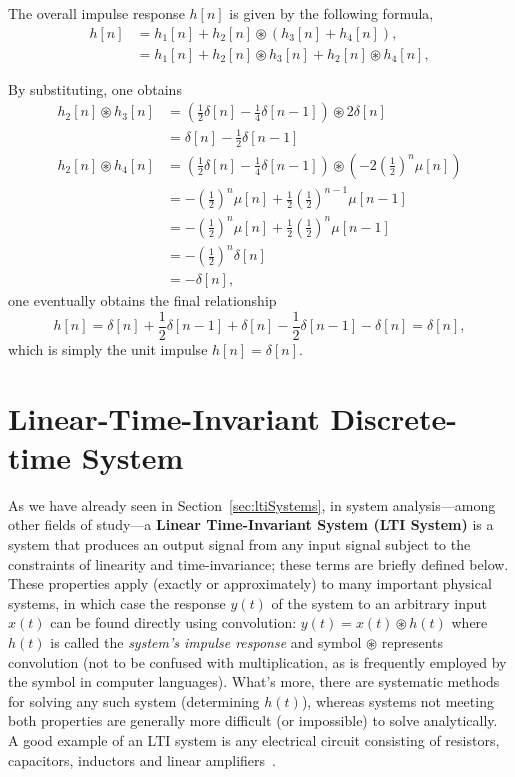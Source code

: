\documentclass[\documentfontsize, twocolumn]{\classname}
\begin{document}
The overall impulse response $h[n]$ is given by the following formula,
\begin{align*}
    h[n] &= h_1[n] +h_2[n] \circledast (h_3[n] + h_4[n]),\\
         &= h_1[n] +h_2[n] \circledast h_3[n] + h_2[n] \circledast h_4[n],
\end{align*}

By substituting, one obtains
\begin{align*}
    h_2[n] \circledast h_3[n] &= \left(\frac 1 2 \delta[n] - \frac 1 4 \delta[n-1]\right) \circledast 2 \delta[n]\\
                              &= \delta[n] - \frac 1 2 \delta[n-1]\\
    h_2[n] \circledast h_4[n] &= \left(\frac 1 2 \delta[n] - \frac 1 4 \delta[n-1]\right) \circledast \left(-2 \left(\frac 1 2\right)^n \mu[n]\right)\\
                              &= -\left(\frac 1 2 \right)^n\mu[n] + \frac 1 2 \left(\frac 1 2\right)^{n-1} \mu[n-1]\\
                              &= -\left(\frac 1 2 \right)^n\mu[n] + \frac 1 2 \left(\frac 1 2\right)^n \mu[n-1]\\
                              &= -\left(\frac 1 2 \right)^n\delta[n] \\
                              &= -\delta[n],
\end{align*}
one eventually obtains the final relationship
\[
    h[n] = \delta[n] + \frac 1 2 \delta[n-1] + \delta[n] - \frac 1 2 \delta[n-1] - \delta[n] = \delta[n],
\]
which is simply the unit impulse $h[n] = \delta[n]$.

\chapter{Linear-Time-Invariant Discrete-time System}

As we have already seen in Section~\ref{sec:ltiSystems}, in system analysis---among other fields of study---a \textbf{Linear Time-Invariant System (LTI System)} is a system that produces an output signal from any input signal subject to the constraints of linearity and time-invariance; these terms are briefly defined below. These properties apply (exactly or ap\-pro\-xi\-ma\-te\-ly) to many important physical systems, in which case the response $y(t)$ of the system to an arbitrary input $x(t)$ can be found directly using convolution: $y(t) = x(t) \circledast h(t)$ where $h(t)$ is called the \emph{system's impulse response} and symbol \textquotesingle$\circledast$\textquotesingle{} represents convolution (not to be confused with multiplication, as is frequently employed by the symbol in computer languages). Wh\-at's more, there are systematic methods for solving any such system (determining $h(t)$), whereas systems not meeting both properties are generally more difficult (or impossible) to solve analytically. A good example of an LTI system is any electrical circuit consisting of resistors, capacitors, inductors and linear amplifiers~\cite{bib:ltiSystems}.
\end{document}

